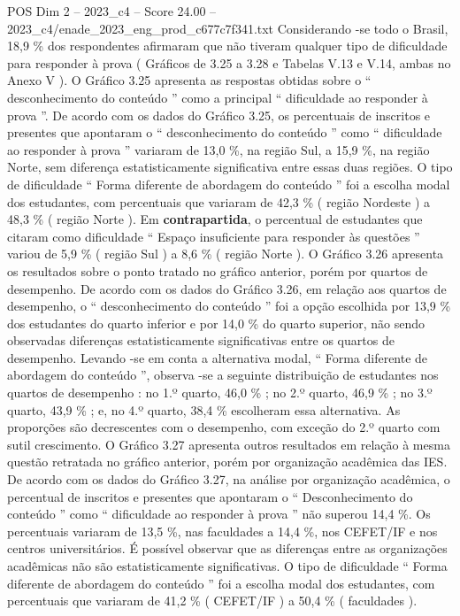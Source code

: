 \begin{textsample}{POS Dim 2 – 2023\_c4 – Score 24.00 – 2023\_c4/enade\_2023\_eng\_prod\_c677c7f341.txt}
Considerando -se todo o Brasil, 18,9 \% dos respondentes afirmaram que não tiveram qualquer tipo de dificuldade para responder à prova ( Gráficos de 3.25 a 3.28 e Tabelas V.13 e V.14, ambas no Anexo V ).
O Gráfico 3.25 apresenta as respostas obtidas sobre o “ desconhecimento do conteúdo ” como a principal “ dificuldade ao responder à prova ”.
De acordo com os dados do Gráfico 3.25, os percentuais de inscritos e presentes que apontaram o “ desconhecimento do conteúdo ” como “ dificuldade ao responder à prova ” variaram de 13,0 \%, na região Sul, a 15,9 \%, na região Norte, sem diferença estatisticamente significativa entre essas duas regiões.
O tipo de dificuldade “ Forma diferente de abordagem do conteúdo ” foi a escolha modal dos estudantes, com percentuais que variaram de 42,3 \% ( região Nordeste ) a 48,3 \% ( região Norte ).
Em \textbf{contrapartida}, o percentual de estudantes que citaram como dificuldade “ Espaço insuficiente para responder às questões ” variou de 5,9 \% ( região Sul ) a 8,6 \% ( região Norte ).
O Gráfico 3.26 apresenta os resultados sobre o ponto tratado no gráfico anterior, porém por quartos de desempenho.
De acordo com os dados do Gráfico 3.26, em relação aos quartos de desempenho, o “ desconhecimento do conteúdo ” foi a opção escolhida por 13,9 \% dos estudantes do quarto inferior e por 14,0 \% do quarto superior, não sendo observadas diferenças estatisticamente significativas entre os quartos de desempenho.
Levando -se em conta a alternativa modal, “ Forma diferente de abordagem do conteúdo ”, observa -se a seguinte distribuição de estudantes nos quartos de desempenho : no 1.º quarto, 46,0 \% ; no 2.º quarto, 46,9 \% ; no 3.º quarto, 43,9 \% ; e, no 4.º quarto, 38,4 \% escolheram essa alternativa.
As proporções são decrescentes com o desempenho, com exceção do 2.º quarto com sutil crescimento.
O Gráfico 3.27 apresenta outros resultados em relação à mesma questão retratada no gráfico anterior, porém por organização acadêmica das IES.
De acordo com os dados do Gráfico 3.27, na análise por organização acadêmica, o percentual de inscritos e presentes que apontaram o “ Desconhecimento do conteúdo ” como “ dificuldade ao responder à prova ” não superou 14,4 \%.
Os percentuais variaram de 13,5 \%, nas faculdades a 14,4 \%, nos CEFET/IF e nos centros universitários.
É possível observar que as diferenças entre as organizações acadêmicas não são estatisticamente significativas.
O tipo de dificuldade “ Forma diferente de abordagem do conteúdo ” foi a escolha modal dos estudantes, com percentuais que variaram de 41,2 \% ( CEFET/IF ) a 50,4 \% ( faculdades ).

\end{textsample}

